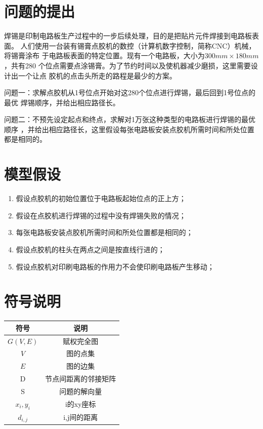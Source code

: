 \documentclass[fontset=windows,a4paper,12pt]{ctexart}
\begin{document}
  \newpage
  \tableofcontents
  \newpage
  \section{问题的提出}
    焊锡是印制电路板生产过程中的一步后续处理，目的是把贴片元件焊接到电路板表面。
    人们使用一台装有锡膏点胶机的数控（计算机数字控制，简称CNC）机械，将锡膏涂布
    于电路板表面的特定位置。现有一个电路板，大小为$300mm\times180mm$，共有280
    个位点需要点涂锡膏。为了节约时间以及使机器减少磨损，这里需要设计出一个让点
    胶机的点击头所走的路程是最少的方案。

    问题一：求解点胶机从1号位点开始对这280个位点进行焊锡，最后回到1号位点的最优
    焊锡顺序，并给出相应路径长。

    问题二：不预先设定起点和终点，求解对1万张这种类型的电路板进行焊锡的最优顺序
    ，并给出相应路径长，这里假设每张电路板安装点胶机所需时间和所处位置都是相同的。
  \section{模型假设}
    \begin{enumerate}
      \item 假设点胶机的初始位置位于电路板起始位点的正上方；
      \item 假设在点胶机进行焊锡的过程中没有焊锡失败的情况；
      \item 每张电路板安装点胶机所需时间和所处位置都是相同的；
      \item 假设点胶机的柱头在两点之间是按直线行进的；
      \item 假设点胶机对印刷电路板的作用力不会使印刷电路板产生移动；
    \end{enumerate}
  \section{符号说明}
    \begin{center}
	  \begin{tabular}{|c|c|}
	  	\hline
	  	符号 & 说明 \\ 
	  	\hline 
	  	$G(V,E)$	&	赋权完全图\\
	  	$V$		& 图的点集\\
	  	$E$		& 图的边集\\
	  	D	&	节点间距离的邻接矩阵\\
	  	S	&	问题的解向量\\
	  	$x_i,y_i$	& i的xy座标\\
	  	$d_{i,j}$ & i,j间的距离\\
	  	\hline
	  \end{tabular} 
	\end{center}
\end{document}
